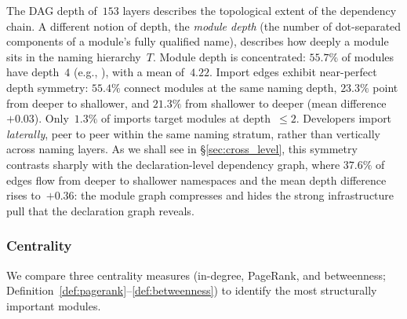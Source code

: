 \label{rem:import-depth-symmetry}
The DAG depth of~$153$ layers describes the topological extent of the dependency chain. A different notion of depth, the \emph{module depth} (the number of dot-separated components of a module's fully qualified name), describes how deeply a module sits in the naming hierarchy~$T$. Module depth is concentrated: $55.7\%$ of modules have depth~$4$ (e.g., ), with a mean of~$4.22$. Import edges exhibit near-perfect depth symmetry: $55.4\%$ connect modules at the same naming depth, $23.3\%$ point from deeper to shallower, and $21.3\%$ from shallower to deeper (mean difference~$+0.03$). Only~$1.3\%$ of imports target modules at depth~$\le 2$. Developers import \emph{laterally}, peer to peer within the same naming stratum, rather than vertically across naming layers. As we shall see in \S\ref{sec:cross_level}, this symmetry contrasts sharply with the declaration-level dependency graph, where $37.6\%$ of edges flow from deeper to shallower namespaces and the mean depth difference rises to~$+0.36$: the module graph compresses and hides the strong infrastructure pull that the declaration graph reveals.

\subsubsection{Centrality}
\label{sec:centrality}
\label{sec:sa-centrality}

We compare three centrality measures (in-degree, PageRank, and betweenness; Definition~\ref{def:pagerank}--\ref{def:betweenness}) to identify the most structurally important modules.

